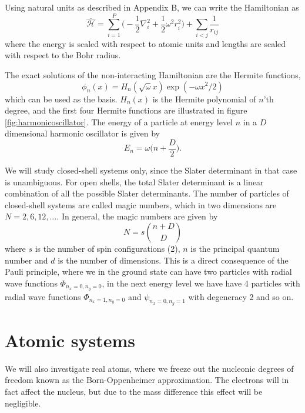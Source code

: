 Using natural units as described in Appendix B, we can write the Hamiltonian as
\begin{equation}
\label{eq:HOHamiltonian}
\hat{\mathcal{H}} = \sum_{i=1}^{P} \Big(-\frac{1}{2} \nabla_i^2 + \frac{1}{2} \omega^2r_i ^2\Big) + \sum_{i<j} \frac{1}{r_{ij}} 
\end{equation}
where the energy is scaled with respect to atomic units and lengths are scaled with respect to the Bohr radius.

The exact solutions of the non-interacting Hamiltonian are the Hermite functions, 
\begin{equation}
\phi_n(x)=H_n(\sqrt{\omega}x)\exp(-\omega x^2/2)
\end{equation}
which can be used as the basis. $H_n(x)$ is the Hermite polynomial of $n$'th degree, and the first four Hermite functions are illustrated in figure \eqref{fig:harmonicoscillator}. The energy of a particle at energy level $n$ in a $D$ dimensional harmonic oscillator is given by
\begin{equation}
E_n=\omega\Big(n+\frac{D}{2}\Big).
\label{eq:HOenergies}
\end{equation}

We will study closed-shell systems only, since the Slater determinant in that case is unambiguous. For open shells, the total Slater determinant is a linear combination of all the possible Slater determinants. The number of particles of closed-shell systems are called magic numbers, which in two dimensions are $N=2,6,12,\hdots$. In general, the magic numbers are given by
\begin{equation}
N=s\binom{n+D}{D}
\label{eq:HOclosedshell}
\end{equation}
where $s$ is the number of spin configurations (2), $n$ is the principal quantum number and $d$ is the number of dimensions. This is a direct consequence of the Pauli principle, where we in the ground state can have two particles with radial wave functions $\Phi_{n_x=0,n_y=0}$, in the next energy level we have have 4 particles with radial wave functions $\Phi_{n_x=1,n_y=0}$ and $\psi_{n_x=0,n_y=1}$ with degeneracy 2 and so on. 




\section{Atomic systems} \label{subsubsec:atomic}
We will also investigate real atoms, where we freeze out the nucleonic degrees of freedom known as the Born-Oppenheimer approximation. The electrons will in fact affect the nucleus, but due to the mass difference this effect will be negligible.


